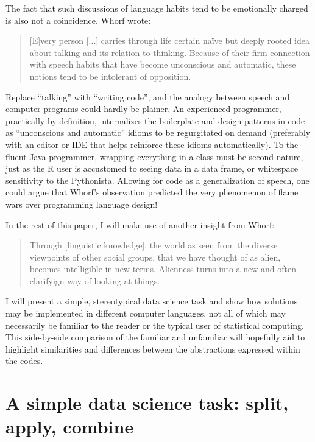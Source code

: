 \documentclass[11pt]{asaproc}
\begin{document}
The fact that such discussions of language habits tend to be emotionally
charged is also not a coincidence. Whorf wrote:

\begin{quotation}
[E]very person [...] carries through life certain na\"ive but deeply rooted
idea about talking and its relation to thinking. Because of their firm
connection with speech habits that have become unconscious and automatic, these
notions tend to be intolerant of opposition.~\cite{Whorf1956sl}
\end{quotation}

Replace ``talking'' with ``writing code'', and the analogy between speech and
computer programs could hardly be plainer. An experienced programmer,
practically by definition, internalizes the boilerplate and design patterns in
code as ``unconscious and automatic'' idioms to be regurgitated on demand
(preferably with an editor or IDE that helps reinforce these idioms
automatically). To the fluent Java programmer, wrapping everything in a class
must be second nature, just as the R user is accustomed to seeing data in a
data frame, or whitespace sensitivity to the Pythonista.  Allowing for code as
a generalization of speech, one could argue that Whorf's observation predicted
the very phenomenon of flame wars over programming language design!

In the rest of this paper, I will make use of another insight from Whorf:

\begin{quotation}
Through [linguistic knowledge], the world as seen from the diverse viewpoints of
other social groups, that we have thought of as alien, becomes intelligible in
new terms. Alienness turns into a new and often clarifyign way of looking at
things.~\cite{Whorf1956lmr}
\end{quotation}

I will present a simple, stereotypical data science task and show how solutions
may be implemented in different computer languages, not all of which may
necessarily be familiar to the reader or the typical user of statistical
computing. This side-by-side comparison of the familiar and unfamiliar will
hopefully aid to highlight similarities and differences between the
abstractions expressed within the codes.



\section{A simple data science task: split, apply, combine}
\end{document}
